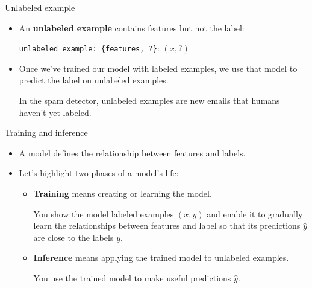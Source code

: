 \documentclass{beamer}
\begin{document}

\begin{frame}{Unlabeled example}

\begin{itemize}
\item 
An {\bf unlabeled example} contains features but not the label:

\medskip
\texttt{unlabeled example: \{features, ?\}}: $(x, ?)$

\medskip
\item Once we've trained our model with labeled examples, we use that model to predict the label on unlabeled examples. 

\medskip
In the spam detector, unlabeled examples are new emails that humans haven't yet labeled.
\end{itemize}

\end{frame}



\begin{frame}{Training and inference}
\begin{itemize}

\medskip
\item A model defines the relationship between features and labels. 
    
\medskip
\item 
Let's highlight two phases of a model's life:

\medskip
\begin{itemize}
\item {\bf Training} means creating or learning the model. 

\medskip
You show the model labeled examples $(x, y)$ and enable it to gradually learn the relationships between features and label so that its predictions $\hat{y}$ are close to the labels $y$.
        
\medskip
\item {\bf Inference} means applying the trained model to unlabeled examples. 

\medskip
You use the trained model to make useful predictions $\hat{y}$.
\end{itemize}
\end{itemize}

\end{frame}

\end{document}
